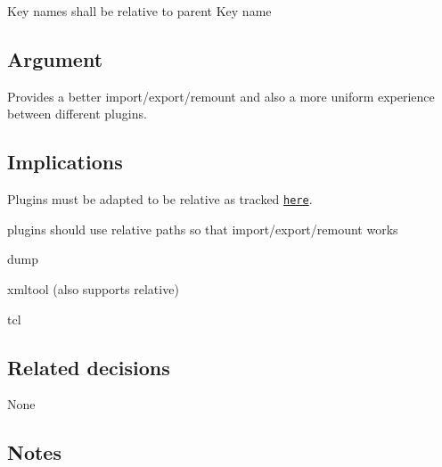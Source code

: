 Key names shall be relative to parent Key name

\subsection*{Argument}

Provides a better import/export/remount and also a more uniform experience between different plugins.

\subsection*{Implications}

Plugins must be adapted to be relative as tracked \href{https://github.com/ElektraInitiative/libelektra/issues/51}{\tt here}.

plugins should use relative paths so that import/export/remount works


\begin{DoxyItemize}
\item dump
\item xmltool (also supports relative)
\item tcl
\end{DoxyItemize}

\subsection*{Related decisions}

None

\subsection*{Notes}